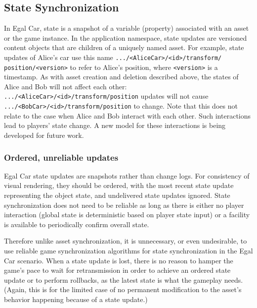 \documentclass{article}
\begin{document}
\subsection{State Synchronization}
\label{statesynchronization}

In Egal Car, state is a snapshot of a variable (property) associated with an asset or the game instance. In the application namespace, state updates are versioned content objects that are children of a uniquely named asset.  For example, state updates of Alice's car use this name \texttt{.../<AliceCar>/<id>/transform/\\position/<version>} to refer to Alice's position, where \texttt{<version>} is a timestamp. As with asset creation and deletion described above, the states of Alice and Bob will not affect each other: \texttt{.../<AliceCar>/<id>/transform/position} updates will not cause \texttt{.../<BobCar>/<id>/transform/position} to change.  Note that this does not relate to the case when Alice and Bob interact with each other. Such interactions lead to players' state change. A new model for these interactions is being developed for future work. 

\subsubsection{Ordered, unreliable updates}
Egal Car state updates are snapshots rather than change logs.  For consistency of visual rendering, they should be ordered, with the most recent state update 
representing the object state, %
and undelivered state updates ignored.
State synchronization does not need to be reliable as long as there is either no player interaction (global state is deterministic based on player state input) or a facility is available to periodically confirm overall state. 

Therefore unlike asset synchronization, it is unnecessary, or even undesirable, to use reliable game synchronization algorithms for state synchronization in the Egal Car scenario.  When a state update is lost, there is no reason to hamper the game's pace to wait for retransmission in order to achieve an ordered state update or to perform rollbacks, as the latest state is what the gameplay needs.  (Again, this is for the limited case of no permanent modification to the asset's behavior happening because of a state update.)
\end{document}
